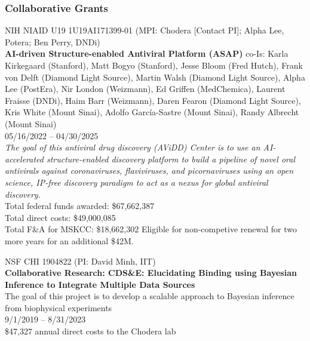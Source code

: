 \documentclass[10pt]{article}
\begin{document}
\subsubsection*{Collaborative Grants}

NIH NIAID U19 1U19AI171399-01 (MPI: Chodera [Contact PI]; Alpha Lee, Potera; Ben Perry, DNDi) \\
{\bf AI-driven Structure-enabled Antiviral Platform (ASAP)}
co-Is: Karla Kirkegaard (Stanford), Matt Bogyo (Stanford), Jesse Bloom (Fred Hutch), Frank von Delft (Diamond Light Source), Martin Walsh (Diamond Light Source), Alpha Lee (PostEra), Nir London (Weizmann), Ed Griffen (MedChemica), Laurent Fraisse (DNDi), Haim Barr (Weizmann), Daren Fearon (Diamond Light Source), Kris White (Mount Sinai), Adolfo Garc\'{i}a-Sastre (Mount Sinai), Randy Albrecht (Mount Sinai) \\
05/16/2022 -- 04/30/2025\\
\emph{The goal of this antiviral drug discovery (AViDD) Center is to use an AI-accelerated structure-enabled discovery platform to build a pipeline of novel oral antivirals against coronaviruses, flaviviruses, and picornaviruses using an open science, IP-free discovery paradigm to act as a nexus for global antiviral discovery.}\\
Total federal funds awarded: \$67,662,387\\
Total direct costs: \$49,000,085\\
Total F\&A for MSKCC: \$18,662,302
Eligible for non-competive renewal for two more years for an additional \$42M.

\vspace{1.5ex}

NSF CHI 1904822 (PI: David Minh, IIT) \\
{\bf Collaborative Research: CDS\&E: Elucidating Binding using Bayesian Inference to Integrate Multiple Data Sources}\\
The goal of this project is to develop a scalable approach to Bayesian inference from biophysical experiments\\
9/1/2019 -- 8/31/2023\\
\$47,327 annual direct costs to the Chodera lab
\end{document}

